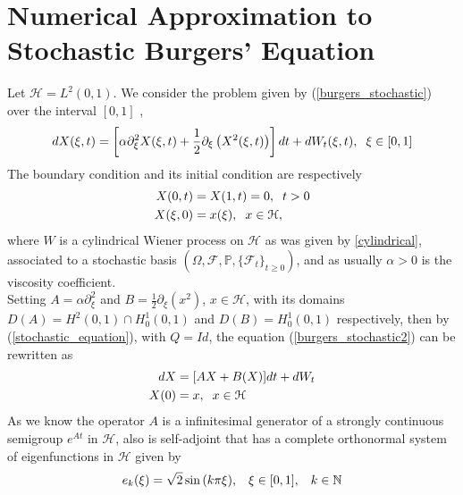     \section{Numerical Approximation to Stochastic Burgers' Equation}
    Let $\mathcal{H} = L^2 (0, 1)$. We consider the problem given by (\ref{burgers_stochastic}) over the interval $[0, 1]$ ,
	\begin{align}
		\label{burgers_stochastic2}
		d X(\xi, t) = \left[\alpha \partial_{\xi}^2 X(\xi, t) + \frac{1}{2} \partial_\xi \left(X^2 (\xi, t)\right) \right] dt + dW_t (\xi, t), \hspace{0.2cm} \xi \in [0, 1] 
	\end{align}
	The boundary condition and its initial condition are respectively 
	\begin{align*}
    	X(0, t) &= X(1, t) = 0 , \hspace{0.2cm} t > 0 \\
		X(\xi, 0) &= x(\xi), \hspace{0.2cm}  x \in \mathcal{H},
	\end{align*}
	where $W$ is a cylindrical Wiener process on $\mathcal{H}$ as was given by \ref{cylindrical}, associated to a stochastic basis $(\Omega, \mathcal{F}, \mathbb{P}, \{\mathcal{F}_t\}_{t \geq 0})$, and as usually $\alpha > 0$ is the viscosity coefficient. \\

	\noindent Setting $A = \alpha \partial^2_{\xi}$ and $B = \frac{1}{2} \partial_{\xi} (x^2)$, $x \in \mathcal{H}$, with its domains $D(A) = H^2 (0, 1) \cap H^1_0 (0, 1)$ and $D(B) = H^1_0 (0, 1)$ respectively, then by (\ref{stochastic_equation}), with $Q = Id$, the equation (\ref{burgers_stochastic2}) can be rewritten as
	\begin{align*}
    	dX &= [AX + B(X)]dt + dW_t \\
        X(0) &= x, \hspace{0.2cm} x \in \mathcal{H}
	\end{align*}	
	As we know the operator $A$ is a infinitesimal generator of a strongly continuous semigroup $e^{At}$ in $\mathcal{H}$, also is self-adjoint that has a complete orthonormal system of eigenfunctions in $\mathcal{H}$ given by
	\begin{align*}
		e_k (\xi) = \sqrt{2} \sin{(k \pi \xi)}, \hspace{3mm} \xi \in [0, 1], \hspace{3mm} k \in \mathbb{N}
	\end{align*}
	
